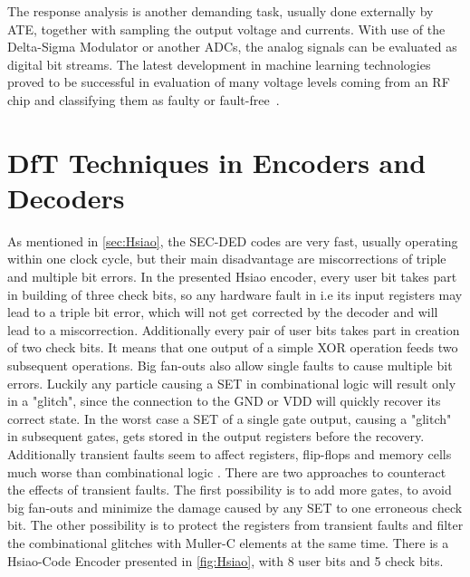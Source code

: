The response analysis is another demanding task, usually done externally by ATE, together with sampling the output voltage and currents. With use of the Delta-Sigma Modulator or another ADCs, the analog signals can be evaluated as digital bit streams. The latest development in machine learning technologies proved to be successful in evaluation of many voltage levels coming from an RF chip and classifying them as faulty or fault-free~\cite{art:neural}.

\section{DfT Techniques in Encoders and Decoders}\label{sec:dft}

As mentioned in \autoref{sec:Hsiao}, the SEC-DED codes are very fast, usually operating within one clock cycle, but their main disadvantage are miscorrections of triple and multiple bit errors. In the presented Hsiao encoder, every user bit takes part in building of three check bits, so any hardware fault in i.e its input registers may lead to a triple bit error, which will not get corrected by the decoder and will lead to a miscorrection. Additionally every pair of user bits takes part in creation of two check bits. It means that one output of a simple XOR operation feeds two subsequent operations. Big fan-outs also allow single faults to cause multiple bit errors. Luckily any particle causing a SET in combinational logic will result only in a "glitch", since the connection to the GND or VDD will quickly recover its correct state. In the worst case a SET of a single gate output, causing a "glitch" in subsequent gates, gets stored in the output registers before the recovery. Additionally transient faults seem to affect registers, flip-flops and memory cells much worse than combinational logic \cite{7,8}. There are two approaches to counteract the effects of transient faults. The first possibility is to add more gates, to avoid big fan-outs and minimize the damage caused by any SET to one erroneous check bit. The other possibility is to protect the registers from transient faults and filter the combinational glitches with Muller-C elements at the same time. There is a Hsiao-Code Encoder presented in \autoref{fig:Hsiao}, with 8 user bits and 5 check bits.


